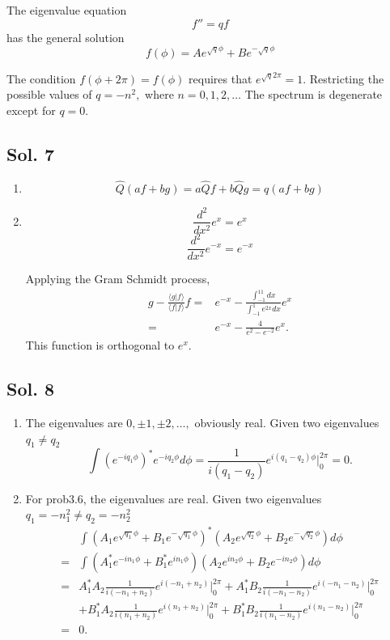 The eigenvalue equation
$$
f''=qf
$$
has the general solution
$$
f(\phi)
=Ae^{\sqrt{q}\phi}+Be^{-\sqrt{q}\phi}
$$

The condition $f(\phi+2\pi)=f(\phi)$ requires that $e^{\sqrt{q}2\pi}=1.$ Restricting the possible values of $q=-n^2,$ where $n=0,1,2,\dots$ The spectrum is degenerate except for $q=0.$

\subsection*{Sol. 7}
\begin{enumerate}
    \item 
    $$
    \hat{Q}(af+bg)=a\hat{Q}f + b\hat{Q}g=q(af+bg)
    $$
    \item 
    $$
    \frac{d^2}{dx^2}e^x = e^x
    $$
    $$
    \frac{d^2}{dx^2}e^{-x} = e^{-x}
    $$

    Applying the Gram Schmidt process,
    \begin{align*}
        g - \frac{\langle g|f\rangle}{\langle f|f\rangle}f
        =&e^{-x} - \frac{\int_{-1}^11dx}{\int_{-1}^1e^{2x}dx}e^x\\
        =&e^{-x}-\frac{4}{e^{2}-e^{-2}}e^x.
    \end{align*}
    This function is orthogonal to $e^x.$
    
\end{enumerate}

\subsection*{Sol. 8}
\begin{enumerate}
    \item The eigenvalues are $0,\pm1,\pm2,\dots,$ obviously real.
    Given two eigenvalues $q_1\neq q_2$
    $$
    \int (e^{-iq_1\phi})^*e^{-iq_2\phi}d\phi
    =\frac{1}{i(q_1-q_2)}
    e^{i(q_1-q_2)\phi}\bigg|^{2\pi}_0 = 0.
    $$
    \item 
    For prob3.6, the eigenvalues are real.
    Given two eigenvalues $q_1=-n_1^2\neq q_2=-n_2^2$
    \begin{align*}
        &\int (A_1e^{\sqrt{q_1}\phi}+B_1e^{-\sqrt{q_1}\phi})^*
    (A_2e^{\sqrt{q_2}\phi}+B_2e^{-\sqrt{q_2}\phi})d\phi\\
    =&
    \int (A_1^*e^{-in_1\phi}+B_1^*e^{in_1\phi})
    (A_2e^{in_2\phi}+B_2e^{-in_2\phi})d\phi\\
    =& A_1^*A_2 \frac{1}{i(-n_1+n_2)}e^{i(-n_1+n_2)}
    \bigg|^{2\pi}_0
    +
    A_1^*B_2 \frac{1}{i(-n_1-n_2)}e^{i(-n_1-n_2)}
    \bigg|^{2\pi}_0\\
    &+
    B_1^*A_2 \frac{1}{i(n_1+n_2)}e^{i(n_1+n_2)}
    \bigg|^{2\pi}_0+
    B_1^*B_2 \frac{1}{i(n_1-n_2)}e^{i(n_1-n_2)}
    \bigg|^{2\pi}_0
     \\
    =& 0.
    \end{align*}
    
\end{enumerate}


